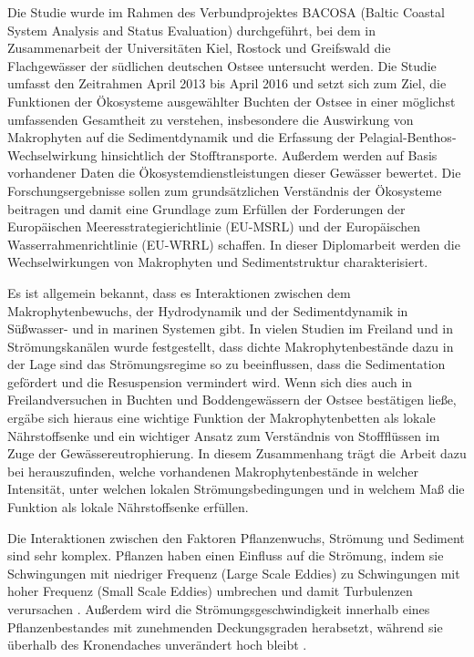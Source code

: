 Die Studie wurde im Rahmen des Verbundprojektes BACOSA (Baltic Coastal System Analysis and Status Evaluation) durchgeführt, bei dem in Zusammenarbeit der Universitäten Kiel, Rostock und Greifswald die Flachgewässer der südlichen deutschen Ostsee untersucht werden. Die Studie umfasst den Zeitrahmen April 2013 bis April 2016 und setzt sich zum Ziel, die Funktionen der Ökosysteme ausgewählter Buchten der Ostsee in einer möglichst umfassenden Gesamtheit zu verstehen, insbesondere die Auswirkung von Makrophyten auf die Sedimentdynamik und die Erfassung der Pelagial-Benthos-Wechselwirkung hinsichtlich der Stofftransporte. Außerdem werden auf Basis vorhandener Daten die Ökosystemdienstleistungen dieser Gewässer bewertet. Die Forschungsergebnisse sollen zum grundsätzlichen Verständnis der Ökosysteme beitragen und damit eine Grundlage zum Erfüllen der Forderungen der Europäischen Meeresstrategierichtlinie (EU-MSRL) und der Europäischen Wasserrahmenrichtlinie (EU-WRRL) schaffen. In dieser Diplomarbeit werden die Wechselwirkungen von Makrophyten und Sedimentstruktur charakterisiert.

Es ist allgemein bekannt, dass es Interaktionen zwischen dem Makrophytenbewuchs, der Hydrodynamik und der Sedimentdynamik in Süßwasser- und in marinen Systemen gibt. In vielen Studien im Freiland und in Strömungskanälen wurde festgestellt, dass dichte Makrophytenbestände dazu in der Lage sind das Strömungsregime so zu beeinflussen, dass die Sedimentation gefördert und die Resuspension vermindert wird. Wenn sich dies auch in Freilandversuchen in Buchten und Boddengewässern der Ostsee bestätigen ließe, ergäbe sich hieraus eine wichtige Funktion der Makrophytenbetten als lokale Nährstoffsenke und ein wichtiger Ansatz zum Verständnis von Stoffflüssen im Zuge der Gewässereutrophierung. In diesem Zusammenhang trägt die Arbeit dazu bei herauszufinden, welche vorhandenen Makrophytenbestände in welcher Intensität, unter welchen lokalen Strömungsbedingungen und in welchem Maß die Funktion als lokale Nährstoffsenke erfüllen.

Die Interaktionen zwischen den Faktoren Pflanzenwuchs, Strömung und Sediment sind sehr komplex. Pflanzen haben einen Einfluss auf die Strömung, indem sie Schwingungen mit niedriger Frequenz (Large Scale Eddies) zu Schwingungen mit hoher Frequenz (Small Scale Eddies) umbrechen und damit Turbulenzen verursachen \citep{leonard_2006}. Außerdem wird die Strömungsgeschwindigkeit innerhalb eines Pflanzenbestandes mit zunehmenden Deckungsgraden herabsetzt, während sie überhalb des Kronendaches unverändert hoch bleibt \citep{li_2014}.

